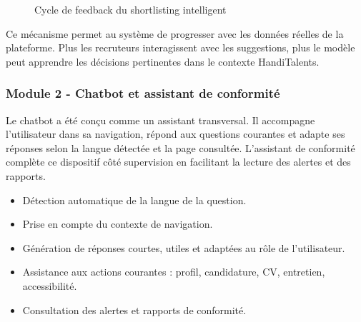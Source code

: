 \documentclass[12pt,a4paper]{report}
\begin{document}
\begin{figure}[H]
\centering
{}
\caption{Cycle de feedback du shortlisting intelligent}
\label{fig:feedback-shortlisting}
\end{figure}

Ce mécanisme permet au système de progresser avec les données réelles de la plateforme. Plus les recruteurs interagissent avec les suggestions, plus le modèle peut apprendre les décisions pertinentes dans le contexte HandiTalents.

\subsubsection{Module 2 - Chatbot et assistant de conformité}

Le chatbot a été conçu comme un assistant transversal. Il accompagne l'utilisateur dans sa navigation, répond aux questions courantes et adapte ses réponses selon la langue détectée et la page consultée. L'assistant de conformité complète ce dispositif côté supervision en facilitant la lecture des alertes et des rapports.

\begin{itemize}
  \item Détection automatique de la langue de la question.
  \item Prise en compte du contexte de navigation.
  \item Génération de réponses courtes, utiles et adaptées au rôle de l'utilisateur.
  \item Assistance aux actions courantes : profil, candidature, CV, entretien, accessibilité.
  \item Consultation des alertes et rapports de conformité.
\end{itemize}
\end{document}

